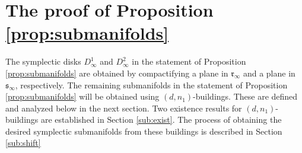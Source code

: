 \documentclass[12pt]{amsart}
\theoremstyle{definition}
\begin{document}

\section{The proof of Proposition \ref{prop:submanifolds}}\label{dbuildings}

The symplectic disks $D^1_{\infty}$ and $D^2_{\infty}$ in the statement of Proposition \ref{prop:submanifolds} are obtained by compactifying a plane in $\mathfrak{r}_\infty$ and a plane in $\mathfrak{s}_\infty$, respectively. The remaining submanifolds in the statement of Proposition \ref{prop:submanifolds}  will be obtained using $(d,n_1)$-buildings.  These are defined and analyzed below in the next section. Two existence results for $(d,n_1)$-buildings are established in Section \ref{sub:exist}. The process of obtaining  the desired symplectic submanifolds from these buildings is described in Section \ref{sub:shift}


\end{document}
